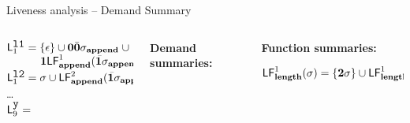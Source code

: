 \documentclass[xcolor=x11names,compress,mathserif]{beamer}
\renewcommand{\(}{\begin{columns}}
\renewcommand{\)}{\end{columns}}
\newcommand{\<}[1]{\begin{column}{#1}}
\renewcommand{\>}{\end{column}}
\begin{document}
\begin{frame}{Liveness analysis -- Demand Summary}
\begin{columns}[c]
\begin{column}[T]{0.40\textwidth}
$\mathsf{L}_{{1}}^{\mbox{\tt l1}} = \{\epsilon\} \cup  \mathbf{0}\bar{\mathbf{0}}\sigma_{\mathbf{append}}\; \cup $\\
$\;\;\;\;\;\;\;\;\;\;\;\mathbf{1}\mathsf{LF}_{\mathit {\mathbf{append}}}^{1}( {\mathit {\bar{\mathbf{1}}}\sigma_{\mathbf{append}}})$\\
$\mathsf{L}_{{1}}^{\mbox{\tt l2}} = \sigma \cup \mathsf{LF}_{\mathit {\mathbf{append}}}^{2}( {\mathit {\bar{\mathbf{1}}}\sigma_{\mathbf{append}}})$\\
\ldots\\
$\mathsf{L}_{{9}}^{\mbox{\tt y}}  = $  \\
 \end{column}
 \begin{column}[T]{0.30\textwidth}
\scriptsize
\centerline{\bf Demand summaries:}
 \end{column}
 \begin{column}[T]{0.38\textwidth}
\scriptsize
\centerline{\bf Function summaries:}
\bigskip
$\mathsf{LF}_{\mathit {\mathbf{length}}}^{1}( {\mathit \sigma}) = \{{\mathbf{2}}\sigma\} \cup \mathsf{LF}_{\mathit {\mathbf{length}}}^{1}( {\mathit {\mathbf{1}}\sigma})$
 \end{column}
\end{columns}
\end{frame}
\end{document}
